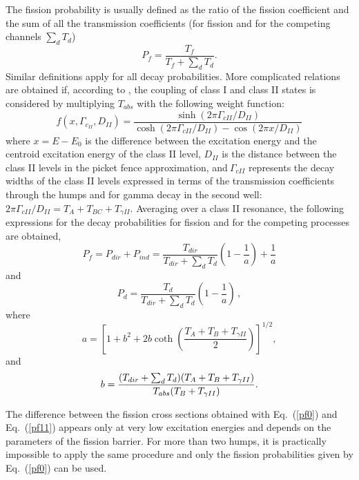 The fission probability is usually defined as the ratio of the fission
coefficient and the sum of all the transmission coefficients (for fission
and for the competing channels $\sum_dT_d$)
\begin{equation}
P_{f}=\frac{T_{f}}{T_{f}+\sum_{d}T_{d}}.  \label{pf0}
\end{equation}
Similar definitions apply for all decay probabilities. More complicated
relations are obtained if, according to \cite{Back:74}, the coupling of
class I and class II states is considered by multiplying $T_{abs}$ with the
following weight function:%
\begin{equation}
f(x,\Gamma_{c_{II}},D_{II})=\frac{\sinh(2\pi\Gamma_{cII}/D_{II})}{\cosh
(2\pi\Gamma_{cII}/D_{II})-\cos(2\pi x/D_{II})}
\end{equation}
where $x=E-E_{0}$ is the difference between the excitation energy and the
centroid excitation energy of the class II level, $D_{II}$ is the distance
between the class II levels in the picket fence approximation, and$\ \Gamma
_{cII}$ represents the decay widths of the class II levels expressed in
terms of the transmission coefficients through the humps and for gamma decay
in the second well:\ $2\pi\Gamma_{cII}/D_{II}=T_{A}+T_{BC}+T_{\gamma II}.$
Averaging over a class II resonance, the following expressions for the decay
probabilities for fission and for the competing processes are obtained,
\begin{equation}
P_{f}=P_{dir}+P_{ind}=\frac{T_{dir}}{T_{dir}+\sum_{d}T_{d}}\left( 1-\frac {1%
}{a}\right) +\frac{1}{a}  \label{pf11}
\end{equation}
and
\begin{equation}
P_{d}=\frac{T_{d}}{T_{dir}+\sum_{d}T_{d}}\left( 1-\frac{1}{a}\right)\,,
\label{pd}
\end{equation}
where
\begin{equation}
a=\left[ 1+b^{2}+2b\coth\left( \frac{T_{A}+T_{B}+T_{\gamma II}}{2}\right) %
\right] ^{1/2},  \label{a11}
\end{equation}
and
\begin{equation}
b=\frac{(T_{dir}+\sum_{d}T_{d})(T_{A}+T_{B}+T_{\gamma II})}{%
T_{abs}(T_{B}+T_{\gamma II})}.  \label{b11}
\end{equation}

The difference between the fission cross sections obtained with Eq.~(\ref{pf0})
and Eq.~(\ref{pf11}) appears only at very low excitation energies and depends
on the parameters of the fission barrier. For more than two humps, it is
practically impossible to apply the same procedure and only the fission
probabilities given by Eq.~(\ref{pf0}) can be used.


